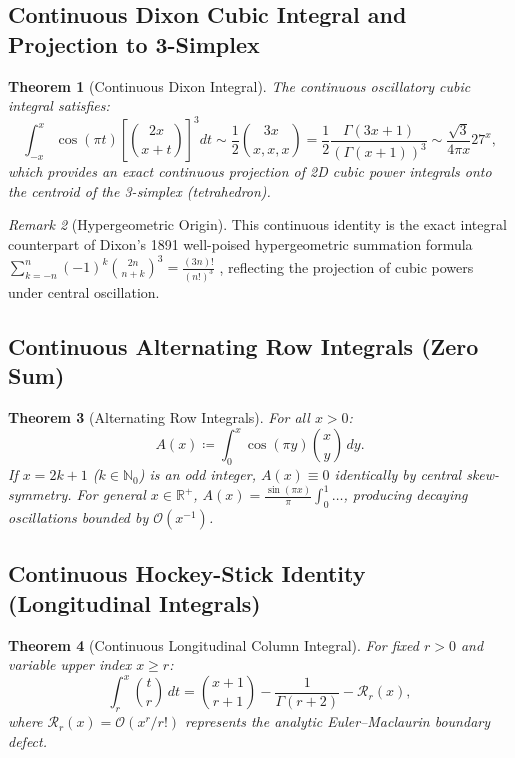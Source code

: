 \documentclass[11pt,a4paper]{article}
\theoremstyle{plain}
\newtheorem{theorem}{Theorem}[section]
\theoremstyle{definition}
\theoremstyle{remark}
\newtheorem{remark}[theorem]{Remark}
\numberwithin{equation}{section}
\begin{document}
\subsection{Continuous Dixon Cubic Integral and Projection to 3-Simplex}

\begin{theorem}[Continuous Dixon Integral]
The continuous oscillatory cubic integral satisfies:
\begin{equation}
\int_{-x}^x \cos(\pi t) \left[\binom{2x}{x+t}\right]^3 dt \sim \frac{1}{2}\binom{3x}{x, x, x} = \frac{1}{2}\frac{\Gamma(3x+1)}{(\Gamma(x+1))^3} \sim \frac{\sqrt{3}}{4\pi x} 27^x,
\end{equation}
which provides an exact continuous projection of 2D cubic power integrals onto the centroid of the 3-simplex (tetrahedron).
\end{theorem}

\begin{remark}[Hypergeometric Origin]
This continuous identity is the exact integral counterpart of Dixon's 1891 well-poised hypergeometric summation formula $\sum_{k=-n}^n (-1)^k \binom{2n}{n+k}^3 = \frac{(3n)!}{(n!)^3}$ \cite{dixon1891}, reflecting the projection of cubic powers under central oscillation.
\end{remark}

\subsection{Continuous Alternating Row Integrals (Zero Sum)}

\begin{theorem}[Alternating Row Integrals]
For all $x > 0$:
\begin{equation}
A(x) \coloneqq \int_0^x \cos(\pi y) \binom{x}{y}\,dy.
\end{equation}
If $x = 2k+1$ ($k \in \mathbb{N}_0$) is an odd integer, $A(x) \equiv 0$ identically by central skew-symmetry. For general $x \in \mathbb{R}^+$, $A(x) = \frac{\sin(\pi x)}{\pi} \int_0^1 \dots$, producing decaying oscillations bounded by $\mathcal{O}(x^{-1})$.
\end{theorem}

\subsection{Continuous Hockey-Stick Identity (Longitudinal Integrals)}

\begin{theorem}[Continuous Longitudinal Column Integral]
For fixed $r > 0$ and variable upper index $x \ge r$:
\begin{equation}
\int_r^x \binom{t}{r}\,dt = \binom{x+1}{r+1} - \frac{1}{\Gamma(r+2)} - \mathcal{R}_r(x),
\end{equation}
where $\mathcal{R}_r(x) = \mathcal{O}\left(x^r / r!\right)$ represents the analytic Euler--Maclaurin boundary defect.
\end{theorem}
\end{document}
